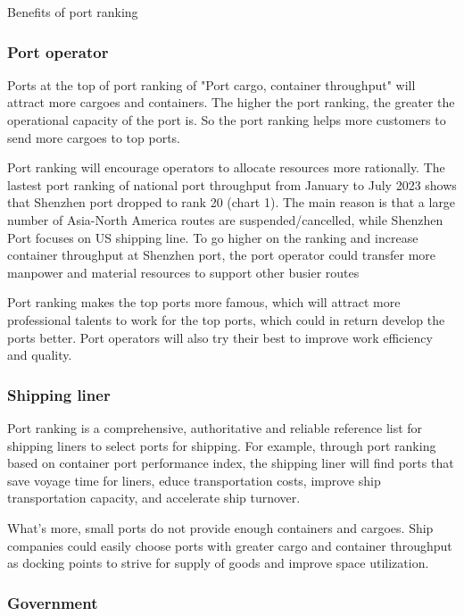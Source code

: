 \documentclass[preprint]{elsarticle}
\begin{document}
Benefits of port ranking

\subsubsection{Port operator}

Ports at the top of port ranking of "Port cargo, container throughput" will attract more cargoes and containers. The higher the port ranking, the greater the operational capacity of the port is. So the port ranking helps more customers to send more cargoes to top ports.

Port ranking will encourage operators to allocate resources more rationally. The lastest port ranking of national port throughput from January to July 2023 shows that Shenzhen port dropped to rank 20 (chart 1). The main reason is that a large number of Asia-North America routes are suspended/cancelled, while Shenzhen Port focuses on US shipping line. To go higher on the ranking and increase container throughput at Shenzhen port, the port operator could transfer more manpower and material resources to support other busier routes

Port ranking makes the top ports more famous, which will attract more professional talents to work for the top ports, which could in return develop the ports better. Port operators will also try their best to improve work efficiency and quality.

\subsubsection{Shipping liner}

Port ranking is a comprehensive, authoritative and reliable reference list for shipping liners to select ports for shipping.
For example, through port ranking based on container port performance index, the shipping liner will find ports that save voyage time for liners, educe transportation costs, improve ship transportation capacity, and accelerate ship turnover.

What's more, small ports do not provide enough containers and cargoes. Ship companies could easily choose ports with greater cargo and container throughput as docking points to strive for supply of goods and improve space utilization.

\subsubsection{Government}
\end{document}
